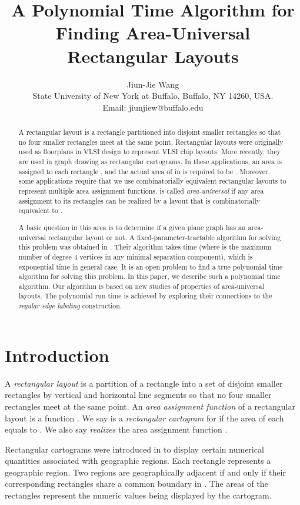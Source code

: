 \documentclass[11pt]{article}
\title{A Polynomial Time Algorithm for Finding Area-Universal
\\ Rectangular Layouts}
\date{}
\author{
Jiun-Jie Wang\\
State University of New York  at Buffalo, Buffalo, NY 14260, USA.\\
Email: jiunjiew@buffalo.edu
}
\begin{document}
\maketitle

\begin{abstract}
A rectangular layout  is a rectangle partitioned into
disjoint smaller rectangles so that no four smaller rectangles meet at
the same point. Rectangular layouts were originally used as floorplans in VLSI design
to represent VLSI chip layouts. More recently, they are used in graph
drawing as rectangular cartograms. In these applications, an area
 is assigned to each rectangle , and the actual area of
 in  is required to be . Moreover, some applications
require that we use combinatorially equivalent rectangular layouts
to represent multiple area assignment functions.  is called
{\em area-universal} if any area assignment to its rectangles can be
realized by a layout that is combinatorially equivalent to .

A basic question in this area is to determine if a given plane graph 
has an area-universal rectangular layout or not. A fixed-parameter-tractable
algorithm for solving this problem was obtained in \cite{EMSV12}.
Their algorithm takes  time (where  is the
maximum number of degree 4 vertices in any minimal separation component),
which is exponential time in general case. It is an open problem to find a
true polynomial time algorithm for solving this problem.
In this paper, we describe such a polynomial time algorithm.
Our algorithm is based on new studies of properties of area-universal
layouts. The polynomial run time is achieved by exploring
their connections to the {\em regular edge labeling} construction.

\end{abstract}




\section{Introduction}\label{sec:Intro-universal}
A {\em rectangular layout}  is a partition of a rectangle 
into a set  of disjoint smaller
rectangles by vertical and horizontal line segments so that no
four smaller rectangles meet at the same point.
An {\em area assignment function} of a rectangular layout 
is a function . We say 
is a {\em rectangular cartogram} for  if the area of each
 equals to . We also say 
{\em realizes} the area assignment function .

Rectangular cartograms were introduced in \cite{Ra34} to display
certain numerical quantities associated with geographic regions.
Each rectangle  represents a geographic region. Two regions are
geographically adjacent if and only if their corresponding rectangles
share a common boundary in . The areas of the rectangles
represent the numeric values being displayed by the cartogram.
\end{document}
